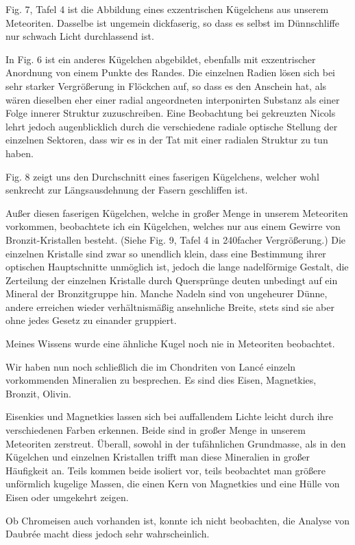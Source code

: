 \documentclass[a4paper, 11pt, oneside]{article}
\begin{document}
Fig. 7, Tafel 4 ist die Abbildung eines exzentrischen Kügelchens aus unserem Meteoriten. Dasselbe ist ungemein dickfaserig, so dass es selbst im Dünnschliffe nur schwach Licht durchlassend ist.

In Fig. 6 ist ein anderes Kügelchen abgebildet, ebenfalls mit exzentrischer Anordnung von einem Punkte des Randes. Die einzelnen Radien lösen sich bei sehr starker Vergrößerung in Flöckchen auf, so dass es den Anschein hat, als wären dieselben eher einer radial angeordneten interponirten Substanz als einer Folge innerer Struktur zuzuschreiben. Eine Beobachtung bei gekreuzten Nicols lehrt jedoch augenblicklich durch die verschiedene radiale optische Stellung der einzelnen Sektoren, dass wir es in der Tat mit einer radialen Struktur zu tun haben.

Fig. 8 zeigt uns den Durchschnitt eines faserigen Kügelchens, welcher wohl senkrecht zur Längsausdehnung der Fasern geschliffen ist.

Außer diesen faserigen Kügelchen, welche in großer Menge in unserem Meteoriten vorkommen, beobachtete ich ein Kügelchen, welches nur aus einem Gewirre von Bronzit-Kristallen besteht. (Siehe Fig. 9, Tafel 4 in 240facher Vergrößerung.) Die einzelnen Kristalle sind zwar so unendlich klein, dass eine Bestimmung ihrer optischen Hauptschnitte unmöglich ist, jedoch die lange nadelförmige Gestalt, die Zerteilung der einzelnen Kristalle durch Quersprünge deuten unbedingt auf ein Mineral der Bronzitgruppe hin. Manche Nadeln sind von ungeheurer Dünne, andere erreichen wieder verhältnismäßig ansehnliche Breite, stets sind sie aber ohne jedes Gesetz zu einander gruppiert.

Meines Wissens wurde eine ähnliche Kugel noch nie in Meteoriten beobachtet.

Wir haben nun noch schließlich die im Chondriten von Lancé einzeln vorkommenden Mineralien zu besprechen. Es sind dies Eisen, Magnetkies, Bronzit, Olivin.

Eisenkies und Magnetkies lassen sich bei auffallendem Lichte leicht durch ihre verschiedenen Farben erkennen. Beide sind in großer Menge in unserem Meteoriten zerstreut. Überall, sowohl in der tufähnlichen Grundmasse, als in den Kügelchen und einzelnen Kristallen trifft man diese Mineralien in großer Häufigkeit an. Teils kommen beide isoliert vor, teils beobachtet man größere unförmlich kugelige Massen, die einen Kern von Magnetkies und eine Hülle von Eisen oder umgekehrt zeigen.

Ob Chromeisen auch vorhanden ist, konnte ich nicht beobachten, die Analyse von Daubrée macht diess jedoch sehr wahrscheinlich.
\end{document}
